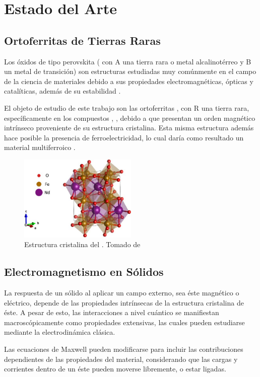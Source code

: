 \documentclass[../main.tex]{subfiles}
\begin{document}
\chapter{Estado del Arte}
\section{Ortoferritas de Tierras Raras}
Los óxidos de tipo perovskita ( con A una tierra rara o metal alcalinotérreo y B un metal de transición) son estructuras estudiadas muy comúnmente en el campo de la ciencia de materiales debido a sus propiedades electromagnéticas, ópticas y catalíticas, además de su estabilidad \cite{Wang2019}.

El objeto de estudio de este trabajo son las ortoferritas , con R una tierra rara, específicamente en los compuestos \neod{}, \sama{}, debido a que presentan un orden magnético intrínseco proveniente de su estructura cristalina. Esta misma estructura además hace posible la presencia de ferroelectricidad, lo cual daría como resultado un material multiferroico \cite{Sharma2024}.
\begin{figure}[H]
    \centering
    \includegraphics[width=0.5\textwidth]{fig/estructuraNd.jpg}
    \caption{Estructura cristalina del \neod{}. Tomado de \cite{Quionero2021}}
    \label{fig:estructNd}
\end{figure}

\section{Electromagnetismo en Sólidos}
La respuesta de un sólido al aplicar un campo externo, sea éste magnético o eléctrico, depende de las propiedades intrínsecas de la estructura cristalina de éste. A pesar de esto, las interacciones a nivel cuántico se manifiestan macroscópicamente como propiedades extensivas, las cuales pueden estudiarse mediante la electrodinámica clásica.

Las ecuaciones de Maxwell pueden modificarse para incluir las contribuciones dependientes de las propiedades del material, considerando que las cargas y corrientes dentro de un éste pueden moverse libremente, o estar ligadas.
\end{document}
